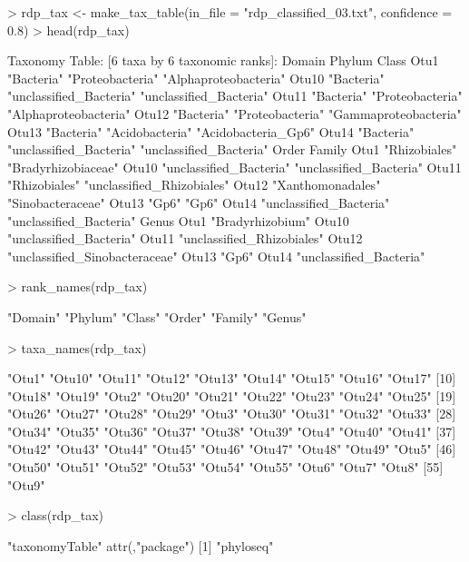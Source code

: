 \documentclass{article}
\begin{document}
\begin{Schunk}
\begin{Sinput}
> rdp_tax <- make_tax_table(in_file = "rdp_classified_03.txt", confidence = 0.8)
> head(rdp_tax)
\end{Sinput}
\begin{Soutput}
Taxonomy Table:     [6 taxa by 6 taxonomic ranks]:
      Domain     Phylum                  Class                  
Otu1  "Bacteria" "Proteobacteria"        "Alphaproteobacteria"  
Otu10 "Bacteria" "unclassified_Bacteria" "unclassified_Bacteria"
Otu11 "Bacteria" "Proteobacteria"        "Alphaproteobacteria"  
Otu12 "Bacteria" "Proteobacteria"        "Gammaproteobacteria"  
Otu13 "Bacteria" "Acidobacteria"         "Acidobacteria_Gp6"    
Otu14 "Bacteria" "unclassified_Bacteria" "unclassified_Bacteria"
      Order                   Family                    
Otu1  "Rhizobiales"           "Bradyrhizobiaceae"       
Otu10 "unclassified_Bacteria" "unclassified_Bacteria"   
Otu11 "Rhizobiales"           "unclassified_Rhizobiales"
Otu12 "Xanthomonadales"       "Sinobacteraceae"         
Otu13 "Gp6"                   "Gp6"                     
Otu14 "unclassified_Bacteria" "unclassified_Bacteria"   
      Genus                         
Otu1  "Bradyrhizobium"              
Otu10 "unclassified_Bacteria"       
Otu11 "unclassified_Rhizobiales"    
Otu12 "unclassified_Sinobacteraceae"
Otu13 "Gp6"                         
Otu14 "unclassified_Bacteria"       
\end{Soutput}
\begin{Sinput}
> rank_names(rdp_tax)
\end{Sinput}
\begin{Soutput}
[1] "Domain" "Phylum" "Class"  "Order"  "Family" "Genus" 
\end{Soutput}
\begin{Sinput}
> taxa_names(rdp_tax)
\end{Sinput}
\begin{Soutput}
 [1] "Otu1"  "Otu10" "Otu11" "Otu12" "Otu13" "Otu14" "Otu15" "Otu16" "Otu17"
[10] "Otu18" "Otu19" "Otu2"  "Otu20" "Otu21" "Otu22" "Otu23" "Otu24" "Otu25"
[19] "Otu26" "Otu27" "Otu28" "Otu29" "Otu3"  "Otu30" "Otu31" "Otu32" "Otu33"
[28] "Otu34" "Otu35" "Otu36" "Otu37" "Otu38" "Otu39" "Otu4"  "Otu40" "Otu41"
[37] "Otu42" "Otu43" "Otu44" "Otu45" "Otu46" "Otu47" "Otu48" "Otu49" "Otu5" 
[46] "Otu50" "Otu51" "Otu52" "Otu53" "Otu54" "Otu55" "Otu6"  "Otu7"  "Otu8" 
[55] "Otu9" 
\end{Soutput}
\begin{Sinput}
> class(rdp_tax)
\end{Sinput}
\begin{Soutput}
[1] "taxonomyTable"
attr(,"package")
[1] "phyloseq"
\end{Soutput}
\end{Schunk}
\end{document}
